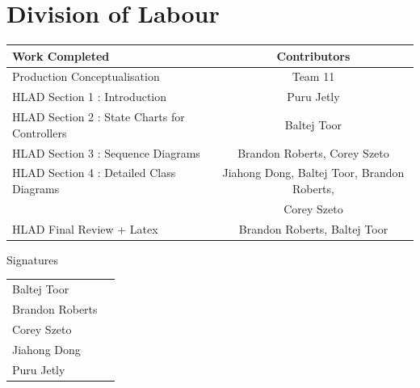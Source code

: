 \documentclass[]{article}
\begin{document}
\newpage
\section{Division of Labour}
\label{sec:division_of_labour}
\begin{center}
\large
			\begin{tabular}{l|c}
				Work Completed   & Contributors \\\hline
				Production Conceptualisation &Team 11 \\
				HLAD Section 1 : Introduction & Puru Jetly \\
				HLAD Section 2 : State Charts for Controllers  & Baltej Toor \\
				HLAD Section 3 : Sequence Diagrams  & Brandon Roberts, Corey Szeto \\
				HLAD Section 4 : Detailed Class Diagrams & Jiahong Dong, Baltej Toor, Brandon Roberts, \\
				& Corey Szeto \\
				HLAD Final Review + Latex  & Brandon Roberts, Baltej Toor \\
			\end{tabular}
			\vspace{0.1in}
\huge Signatures
\end{center}
			\vspace{0.3in}
\large
			\begin{tabular}{l|r}
			\vspace{1in}
				Baltej Toor  & \underline{\hspace{8cm}} \\
			\vspace{1in}
				Brandon Roberts   & \underline{\hspace{8cm}} \\
			\vspace{1in}
				Corey Szeto  & \underline{\hspace{8cm}} \\
			\vspace{1in}
				Jiahong Dong   & \underline{\hspace{8cm}} \\
			\vspace{1in}
				Puru Jetly   & \underline{\hspace{8cm}} \\
			\end{tabular}
\end{document}
